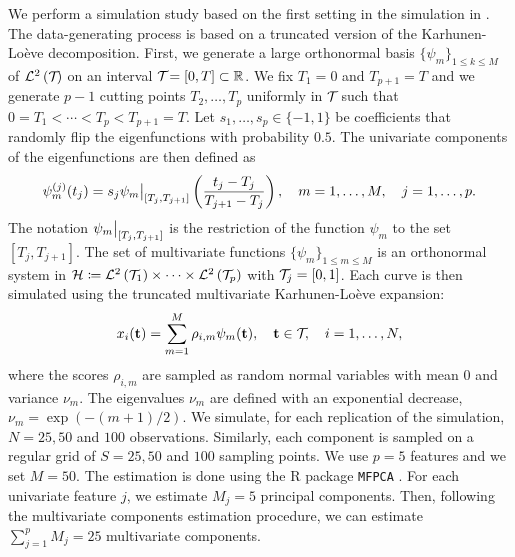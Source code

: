 We perform a simulation study based on the first setting in the simulation in \cite{happMultivariateFunctionalPrincipal2018}. The data-generating process is based on a truncated version of the Karhunen-Loève decomposition. First, we generate a large orthonormal basis $\{\psi_m\}_{1 \leq k \leq M}$ of $\mathcal{L}^{2}\left(\mathcal{T}_{}\right)$ on an interval $\mathcal{T}_{} = [0, T] \subset \mathbb{R}$. We fix $T_1 = 0$ and $T_{p + 1} = T$ and we generate $p - 1$ cutting points $T_2, \dots, T_p$ uniformly in $\mathcal{T}_{}$ such that $0 = T_1 < \cdots < T_p < T_{p+1} = T$. Let $s_1, \dots, s_p \in \{-1, 1\}$ be coefficients that randomly flip the eigenfunctions with probability $0.5$. The univariate components of the eigenfunctions are then defined as
\begin{equation}\label{eq:simulation_uni_component}
    \psi_m^{(j)}(t_j) = s_j \restr{\psi_m}{[T_j, T_{j + 1}]}\left(\frac{t_j - T_j}{T_{j + 1} - T_j}\right), \quad m = 1, \dots, M, \quad j = 1, \dots, p.
\end{equation}
The notation $\restr{\psi_m}{[T_j, T_{j + 1}]}$ is the restriction of the function $\psi_m$ to the set $[T_j, T_{j + 1}]$. The set of multivariate functions $\{\psi_m\}_{1 \leq m \leq M}$ is an orthonormal system in $\mathcal{H} \coloneqq \mathcal{L}^{2}\left(\mathcal{T}_{1}\right) \times \dots \times \mathcal{L}^{2}\left(\mathcal{T}_{p}\right)$ with $\mathcal{T}_{j} = [0, 1]$. Each curve is then simulated using the truncated multivariate Karhunen-Loève expansion:
\begin{equation}
    x_i(\mathbf{t}) = \sum_{m = 1}^M \rho_{i, m} \psi_m(\mathbf{t}), \quad \mathbf{t} \in \mathcal{T}_{},\quad i = 1, \dots, N,
\end{equation}
where the scores $\rho_{i, m}$ are sampled as random normal variables with mean $0$ and variance $\nu_m$. The eigenvalues $\nu_m$ are defined with an exponential decrease, $\nu_m = \exp(-(m + 1)/2)$. We simulate, for each replication of the simulation, $N = 25, 50$ and $100$ observations. Similarly, each component is sampled on a regular grid of $S = 25, 50$ and $100$ sampling points. We use $p = 5$ features and we set $M = 50$. The estimation is done using the \textsf{R} package \texttt{MFPCA} \citep{happ-kurzObjectOrientedSoftwareFunctional2020}. For each univariate feature $j$, we estimate $M_j = 5$ principal components. Then, following the multivariate components estimation procedure, we can estimate $\sum_{j = 1}^p M_j = 25$ multivariate components. 

